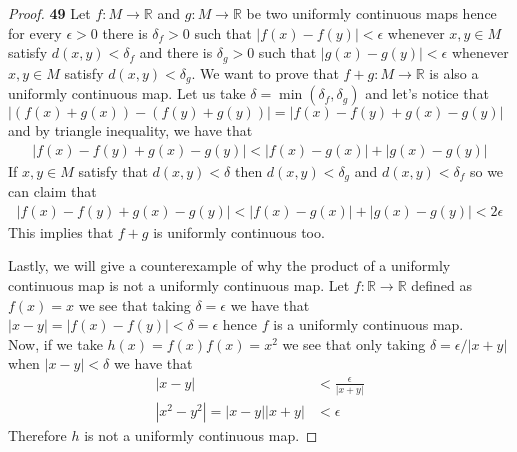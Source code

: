 \documentclass[11pt]{article}
\newcommand{\R}{\mathbb{R}}
\theoremstyle{definition}
\begin{document}
    \cleardoublepage
    \begin{proof}{\textbf{49}}
        Let $f: M \to \R$ and $g:M \to \R$ be two uniformly continuous maps
        hence for every $\epsilon > 0$ there is $\delta_f > 0$ such that
        $|f(x) - f(y)| < \epsilon$ whenever $x,y \in M$ satisfy
        $d(x,y)<\delta_f$ and there is $\delta_g > 0$ such that
        $|g(x) - g(y)| < \epsilon$ whenever $x,y \in M$ satisfy
        $d(x,y) < \delta_g$. We want to prove that $f + g: M \to \R$ is also
        a uniformly continuous map.
        Let us take $\delta = \min(\delta_f, \delta_g)$ and let's notice that
        $|(f(x) + g(x)) - (f(y) + g(y))| = |f(x) -f(y) + g(x) - g(y)|$
        and by triangle inequality, we have that
        \begin{align*}
            |f(x) -f(y) + g(x) - g(y)| < |f(x) - g(x)| + |g(x) - g(y)| 
        \end{align*}
        If $x,y \in M$ satisfy that $d(x,y) < \delta$ then $d(x,y) < \delta_g$
        and $d(x,y) < \delta_f$ so we can claim that
        \begin{align*}
            |f(x) -f(y) + g(x) - g(y)| < |f(x) - g(x)| + |g(x) - g(y)| < 2\epsilon
        \end{align*}
        This implies that $f+g$ is uniformly continuous too.

        Lastly, we will give a counterexample of why the product of
        a uniformly continuous map is not a uniformly continuous map.
        Let $f: \R \to\R$ defined as $f(x) = x$ we see that taking
        $\delta = \epsilon$ we have that
        $|x - y| = |f(x) - f(y)| < \delta = \epsilon$ hence $f$ is a uniformly
        continuous map.\\
        Now, if we take $h(x) = f(x)f(x) = x^2$ we see that
        only taking $\delta = \epsilon/|x + y|$ when $|x -y| < \delta$
        we have that
        \begin{align*}
            |x - y| &< \frac{\epsilon}{|x + y|}\\
            |x^2 - y^2| = |x - y||x + y| &< \epsilon
        \end{align*}
        Therefore $h$ is not a uniformly continuous map.
    \end{proof}
\end{document}
